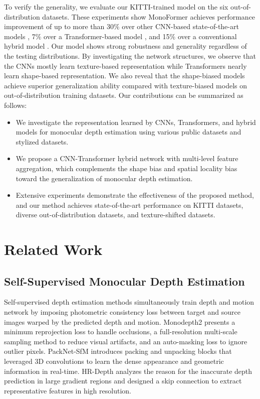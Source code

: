 \documentclass[letterpaper]{article} \usepackage{aaai23}  \usepackage{times}  \usepackage{helvet}  \usepackage{courier}  \usepackage[hyphens]{url}  \usepackage{graphicx} \urlstyle{rm} \def\UrlFont{\rm}  \usepackage{natbib}  \usepackage{caption} \frenchspacing  \setlength{\pdfpagewidth}{8.5in} \setlength{\pdfpageheight}{11in} \usepackage{algorithm}
\begin{document}
To verify the generality, we evaluate our KITTI-trained model on the six out-of-distribution datasets.
These experiments show MonoFormer achieves performance improvement of up to more than 30$\%$ over other CNN-based state-of-the-art models \cite{godard2019digging,zhou2021r,guizilini20203d}, 7$\%$ over a Transformer-based model \cite{dosovitskiy2020image}, and 15$\%$ over a conventional hybrid model \cite{yang2021transformer}. Our model shows strong robustness and generality regardless of the testing distributions.
By investigating the network structures, we observe that the CNNs mostly learn texture-based representation while Transformers nearly learn shape-based representation. 
We also reveal that the shape-biased models achieve superior generalization ability compared with texture-biased models on out-of-distribution training datasets. 
Our contributions can be summarized as follows:
\begin{itemize}
    \item We investigate the representation learned by CNNs, Transformers, and hybrid models for monocular depth estimation
    using various public datasets and stylized datasets. 
    \item We propose a CNN-Transformer hybrid network with multi-level feature aggregation, which complements the shape bias and spatial locality bias toward the generalization of monocular depth estimation.
    \item Extensive experiments demonstrate the effectiveness of the proposed method, and our method achieves state-of-the-art performance on KITTI datasets, diverse out-of-distribution datasets, and texture-shifted datasets.
\end{itemize}

\section{Related Work}

\subsection{Self-Supervised Monocular Depth Estimation}
Self-supervised depth estimation methods \cite{zhou2017unsupervised,godard2019digging,guizilini20203d,lyu2020hr,klingner2020self,xiong2021self} simultaneously train depth and motion network by imposing photometric consistency loss between target and source images warped by the predicted depth and motion.
Monodepth2 \cite{godard2019digging} presents a minimum reprojection loss to handle occlusions, a full-resolution multi-scale sampling method to reduce visual artifacts, and an auto-masking loss to ignore outlier pixels. 
PackNet-SfM \cite{guizilini20203d} introduces packing and unpacking blocks that leveraged 3D convolutions to learn the dense appearance and geometric information in real-time. 
HR-Depth \cite{lyu2020hr} analyzes the reason for the inaccurate depth prediction in large gradient regions and designed a skip connection to extract representative features in high resolution.
\end{document}
